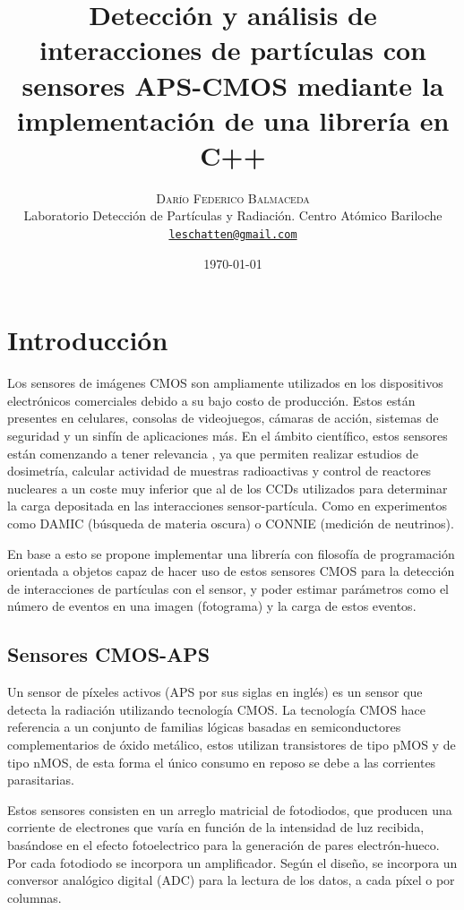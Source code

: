 \documentclass[twoside,twocolumn]{article}
\title{Detección y análisis de interacciones de partículas con sensores APS-CMOS mediante la implementación de una librería en C++}
\author{%
    \textsc{Darío Federico Balmaceda} \\[1ex]     %
    \normalsize Laboratorio Detección de Partículas y Radiación. Centro Atómico Bariloche \\        %
    \normalsize \href{mailto:leschatten@gmail.com}{\texttt{leschatten@gmail.com}}                   %
  }
\date{\today}
\begin{document}
  
  \maketitle              %
  
  \section{Introducción}\label{sec:intro}
    \lettrine[nindent=0em,lines=3]{L}os sensores de imágenes CMOS son ampliamente utilizados en los dispositivos electrónicos comerciales
    debido a su bajo costo de producción. Estos están presentes en celulares, consolas de videojuegos, cámaras de acción,
    sistemas de seguridad y un sinfín de aplicaciones más.
    En el ámbito científico, estos sensores están comenzando a tener relevancia \cite{PerezCMOS},
    ya que permiten realizar estudios de dosimetría, calcular actividad de muestras radioactivas y control de reactores nucleares
    a un coste muy inferior que al de los CCDs utilizados para determinar la carga depositada en las interacciones sensor-partícula.
    Como en experimentos como DAMIC (búsqueda de materia oscura)\cite{DAMIC}
    o CONNIE (medición de neutrinos)\cite{CONNIE}.

    En base a esto se propone implementar una librería con filosofía de programación orientada a objetos
    capaz de hacer uso de estos sensores CMOS para la detección de interacciones de partículas con el sensor,
    y poder estimar parámetros como el número de eventos en una imagen (fotograma) y la carga de estos eventos.

    \subsection{Sensores CMOS-APS}\label{sec:intro:CMOS_sensor}
      Un sensor de píxeles activos (APS por sus siglas en inglés) es un sensor que detecta la radiación utilizando tecnología CMOS.
      La tecnología CMOS hace referencia a un conjunto de familias lógicas basadas en semiconductores complementarios de óxido metálico,
      estos utilizan transistores de tipo pMOS y de tipo nMOS, de esta forma el único consumo en reposo se debe a las corrientes parasitarias.

      Estos sensores consisten en un arreglo matricial de fotodiodos,
      que producen una corriente de electrones que varía en función de la intensidad de luz recibida,
      basándose en el efecto fotoelectrico para la generación de pares electrón-hueco.
      Por cada fotodiodo se incorpora un amplificador. Según el diseño, se incorpora
      un conversor analógico digital (ADC) para la lectura de los datos, a cada píxel o por columnas.
\end{document}
